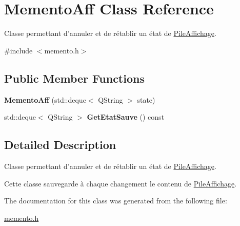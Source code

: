 \hypertarget{class_memento_aff}{\section{Memento\-Aff Class Reference}
\label{class_memento_aff}
}


Classe permettant d'annuler et de rétablir un état de \hyperlink{class_pile_affichage}{Pile\-Affichage}.  




{\ttfamily \#include $<$memento.\-h$>$}

\subsection*{Public Member Functions}
\begin{DoxyCompactItemize}
\item 
\hypertarget{class_memento_aff_a0286b7961cf51f82ca2241b7aa8a9d3b}{{\bfseries Memento\-Aff} (std\-::deque$<$ Q\-String $>$ state)}\label{class_memento_aff_a0286b7961cf51f82ca2241b7aa8a9d3b}

\item 
\hypertarget{class_memento_aff_ab2e4c86ddea4e8da29e7b3410c860c97}{std\-::deque$<$ Q\-String $>$ {\bfseries Get\-Etat\-Sauve} () const }\label{class_memento_aff_ab2e4c86ddea4e8da29e7b3410c860c97}

\end{DoxyCompactItemize}


\subsection{Detailed Description}
Classe permettant d'annuler et de rétablir un état de \hyperlink{class_pile_affichage}{Pile\-Affichage}. 

Cette classe sauvegarde à chaque changement le contenu de \hyperlink{class_pile_affichage}{Pile\-Affichage}. 

The documentation for this class was generated from the following file\-:\begin{DoxyCompactItemize}
\item 
\hyperlink{memento_8h}{memento.\-h}\end{DoxyCompactItemize}

